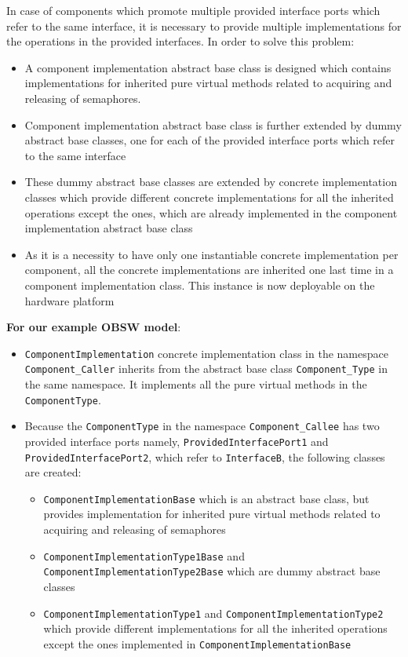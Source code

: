 In case of components which promote multiple provided interface ports which refer to the same interface, it is necessary to provide multiple implementations for the operations in the provided interfaces. In order to solve this problem:
\begin{itemize}
\item A component implementation abstract base class is designed which contains implementations for inherited pure virtual methods related to acquiring and releasing of semaphores.
\item Component implementation abstract base class is further extended by dummy abstract base classes, one for each of the provided interface ports which refer to the same interface
\item These dummy abstract base classes are extended by concrete implementation classes which provide different concrete implementations for all the inherited operations except the ones, which are already implemented in the component implementation abstract base class
\item As it is a necessity to have only one instantiable concrete implementation per component, all the concrete implementations are inherited one last time in a component implementation class. This instance is now deployable on the hardware platform
\end{itemize}
 
\textbf{For our example OBSW model}:
\begin{itemize}
\item \texttt{Component\allowbreak Implementation} concrete implementation class in the namespace \texttt{Component\_Caller} inherits from the abstract base class \texttt{Component\_Type} in the same namespace. It implements all the pure virtual methods in the \texttt{ComponentType}.
\item Because the \texttt{ComponentType} in the namespace \texttt{Component\_Callee} has two provided interface ports namely, \texttt{Provided\allowbreak Interface\allowbreak Port1} and \texttt{Provided\allowbreak Interface\allowbreak Port2}, which refer to \texttt{InterfaceB}, the following classes are created:
\begin{itemize}
\item \texttt{ComponentImplementation\allowbreak Base} which is an abstract base class, but provides implementation for inherited pure virtual methods related to acquiring and releasing of semaphores
\item \texttt{Component\allowbreak Implementation\allowbreak Type1Base} and \texttt{Component\allowbreak Implementation\allowbreak Type2Base} which are dummy abstract base classes
\item \texttt{Component\allowbreak Implementation\allowbreak Type1} and \texttt{Component\allowbreak Implementation\allowbreak Type2} which provide different implementations for all the inherited operations except the ones implemented in \texttt{Component\allowbreak Implementation\allowbreak Base}
\end{itemize}   
\end{itemize} 

